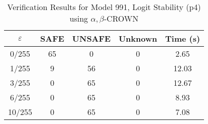 \begin{table}[htbp]
\centering
\caption{Verification Results for Model 991, Logit Stability (p4) using $\alpha,\beta$-CROWN}
\label{tab:model991_p4_abcrown}
\begin{tabular}{|c|c|c|c|c|}
\hline
$\varepsilon$ & SAFE & UNSAFE & Unknown & Time (s) \\ \hline
0/255 & 65 & 0 & 0 & 2.65 \\ \hline
1/255 & 9 & 56 & 0 & 12.03 \\ \hline
3/255 & 0 & 65 & 0 & 12.67 \\ \hline
6/255 & 0 & 65 & 0 & 8.93 \\ \hline
10/255 & 0 & 65 & 0 & 7.08 \\ \hline
\end{tabular}
\end{table}
